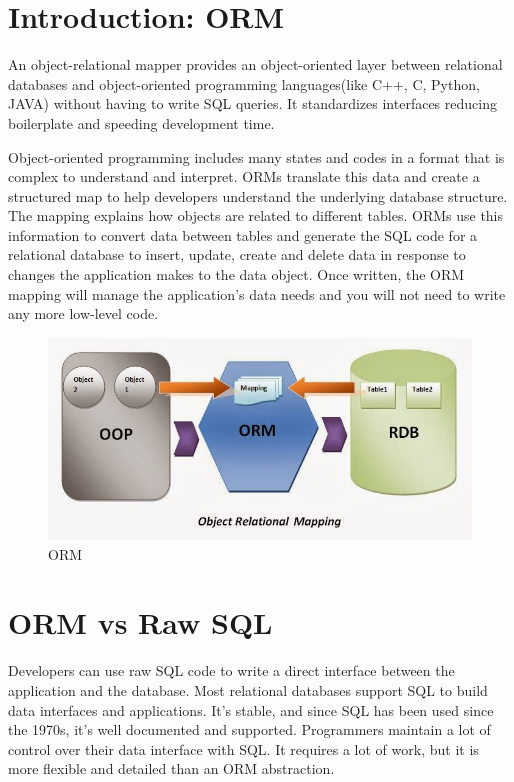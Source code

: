 \documentclass[10pt,a4paper,twoside]{article}
\begin{document}
\section{Introduction: ORM}
\item An object-relational mapper provides an object-oriented layer between relational databases and object-oriented programming languages(like C++, C, Python, JAVA) without having to write SQL queries. It standardizes interfaces reducing boilerplate and speeding development time.
\item Object-oriented programming includes many states and codes in a format that is complex to understand and interpret. ORMs translate this data and create a structured map to help developers understand the underlying database structure. The mapping explains how objects are related to different tables. ORMs use this information to convert data between tables and generate the SQL code for a relational database to insert, update, create and delete data in response to changes the application makes to the data object. Once written, the ORM mapping will manage the application’s data needs and you will not need to write any more low-level code.
\begin{figure}
  \includegraphics[width=\linewidth]{./images/orm1.JPG}
  \caption{ORM}
  \label{fig:ORM}
\end{figure}

\section{ORM vs Raw SQL}
Developers can use raw SQL code to write a direct interface between the application and the database. Most relational databases support SQL to build data interfaces and applications. It’s stable, and since SQL has been used since the 1970s, it’s well documented and supported. Programmers maintain a lot of control over their data interface with SQL. It requires a lot of work, but it is more flexible and detailed than an ORM abstraction.
\end{document}

